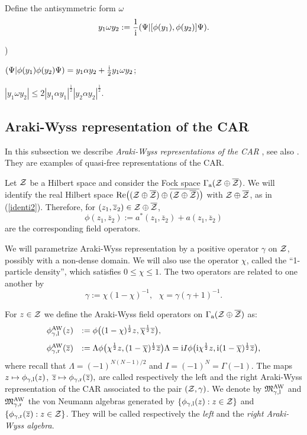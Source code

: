 \documentclass{svmult}
\newcounter{smallarabics}
\newenvironment{arabicenumerate}
{\begin{list}{{\normalfont\textrm{\arabic{smallarabics})}}}
  {\usecounter{smallarabics}\setlength{\itemindent}{0cm}
   \setlength{\leftmargin}{5ex}\setlength{\labelwidth}{4ex}
   \setlength{\topsep}{0.75\parsep}\setlength{\partopsep}{0ex}
   \setlength{\itemsep}{0ex}}}
{\end{list}}
\newcommand{\ben}{\begin{arabicenumerate}}
\newcommand{\een}{\end{arabicenumerate}}
\newcommand{\beq}{\begin{equation}}
\newcommand{\eeq}{\end{equation}}
\def\bet{\begin{theorem}}
\def\eet{\end{theorem}}
\def\AW{{\rm AW}}
\def\Re{{\rm Re}}
\def\bar{\overline}
\def\l{{\rm l}}
\def\r{{\rm r}}
\def\12{{\frac12}}
\def\AW{{\rm AW}}
\def\cZ{{\cal Z}}
\def\fM{{\mathfrak M}}
\def\a{{\rm a}}
\def\i{{\rm i}}
\def\12{\frac{1}{2}}
\def\l{{\rm l}}
\def\r{{\rm r}}
\def\12{\frac{1}{2}}
\begin{document}
Define the antisymmetric form $\omega$
\beq
y_1\omega y_2:=\frac{1}{\i}(\Psi|[\phi(y_1),\phi(y_2)]\Psi).\label{ome}\eeq

\bet\ben\item
$(\Psi|\phi(y_1)\phi(y_2)\Psi)=y_1\alpha y_2+\frac{\i}{2} y_1\omega y_2$;
\item
$|y_1\omega y_2|\leq 2|y_1\alpha y_1|^{\frac12}|y_2\alpha y_2|^{\frac12}$.
\een\label{muu}\eet





\subsection{Araki-Wyss representation of the CAR}
\label{sAWy}


In this subsection we describe {\em  Araki-Wyss representations of the 
CAR} \cite{AWy},
see also \cite{JP}. They are
examples of quasi-free representations of  the CAR.

Let $\cZ$ be a Hilbert space and  consider  the Fock space
$\Gamma_\a(\cZ\oplus\bar\cZ)$.
We will identify the real Hilbert space
$\Re\bigl((\cZ\oplus\bar\cZ)\oplus\bar{(\cZ\oplus\bar\cZ)}\bigr)$ with
$\cZ\oplus\bar\cZ$, as in (\ref{identi2}).
 Therefore,
for $(z_1,\bar
z_2)\in\cZ\oplus\bar\cZ$, \[
\phi(z_1,\bar z_2):=a^*(z_1,\bar z_2)+a(z_1,\bar
z_2)\]
are the corresponding field operators.


We will parametrize Araki-Wyss representation by a positive operator $\gamma$
on $\cZ$,
possibly with a non-dense domain. We will also use the operator  $\chi$, called the
``1-particle density'', which
satisfies $0\leq\chi\leq1$.
The two operators are related to one another by
\beq\gamma:=\chi(1-\chi)^{-1},\ \ \ \chi=\gamma(\gamma+1)^{-1}.
\label{rho}\eeq




 For $z\in  \cZ$ we define  the Araki-Wyss field operators  on
 $\Gamma_\a(\cZ\oplus\bar\cZ)$ as:
\[\begin{array}{rl}
 \phi_{\gamma,\l}^\AW(z)&:=\phi\bigl((1-\chi)^{\12}z,\bar\chi^{\12}\bar z\bigr)
,\\[3mm]
 \phi_{\gamma,\r}^\AW(\bar z)&:=\Lambda
\phi\bigl(\chi^{\12}z,
(1-\bar\chi)^{\12}\bar z\bigr)\Lambda=
\i I\phi\bigl(\i\chi^{\12}z,
\i(1-\bar\chi)^{\12}\bar z\bigr)
,\end{array}\]
where recall that $\Lambda=(-1)^{N(N-1)/2}$ and $I=(-1)^N=\Gamma(-1)$.
The maps $z \mapsto \phi_{\gamma, \l}(z)$,
 $\bar z \mapsto \phi_{\gamma, \r}(\bar z),$ are called 
respectively 
 the left and the right Araki-Wyss representation of the  CAR associated to 
the pair $(\cZ, \gamma)$. 
We denote by $\fM_{\gamma,\l}^\AW$ and $\fM_{\gamma,\r}^\AW$ 
the von Neumann algebras
generated by $\{\phi_{\gamma,\l}(z) : z\in \cZ\}$ and  
$\{\phi_{\gamma,\r}(\bar z) : z\in \cZ\}$.
They will be called respectively the {\em
 left} and the {\em right Araki-Wyss algebra}.
\end{document}
